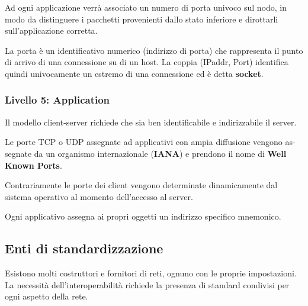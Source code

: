             Ad ogni applicazione verrà associato un numero di porta univoco sul nodo, in modo da distinguere i pacchetti provenienti dallo stato inferiore e dirottarli sull'applicazione corretta.

            La porta è un identificativo numerico (indirizzo di porta) che rappresenta il punto di arrivo di una connessione su di un host. La coppia (IPaddr, Port) identifica quindi univocamente un estremo di una connessione ed è detta \textbf{socket}.

        \subsubsection{Livello 5: Application}
            Il modello client-server richiede che sia ben identificabile e indirizzabile il server.

            Le porte TCP o UDP assegnate ad applicativi con ampia diffusione vengono as- segnate da un organismo internazionale (\textbf{IANA}) e prendono il nome di \textbf{Well Known Ports}.

            Contrariamente le porte dei client vengono determinate dinamicamente dal sistema operativo al momento dell'accesso al server.

            Ogni applicativo assegna ai propri oggetti un indirizzo specifico mnemonico.

    \subsection{Enti di standardizzazione}
        Esistono molti costruttori e fornitori di reti, ognuno con le proprie impostazioni. La necessità dell'interoperabilità richiede la presenza di standard condivisi per ogni aspetto della rete.


